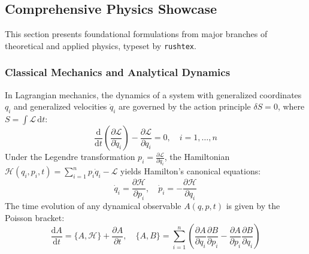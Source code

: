 \documentclass[11pt, a4paper]{article}
\begin{document}
\subsection{Comprehensive Physics Showcase}
This section presents foundational formulations from major branches of theoretical and applied physics, typeset by \texttt{rushtex}.

\subsubsection{Classical Mechanics and Analytical Dynamics}
In Lagrangian mechanics, the dynamics of a system with generalized coordinates $q_i$ and generalized velocities $\dot{q}_i$ are governed by the action principle $\delta S = 0$, where $S = \int \mathcal{L} \, \mathrm{d}t$:
\begin{equation}
\frac{\mathrm{d}}{\mathrm{d}t} \left( \frac{\partial \mathcal{L}}{\partial \dot{q}_i} \right) - \frac{\partial \mathcal{L}}{\partial q_i} = 0, \quad i = 1, \dots, n
\end{equation}
Under the Legendre transformation $p_i = \frac{\partial \mathcal{L}}{\partial \dot{q}_i}$, the Hamiltonian $\mathcal{H}(q_i, p_i, t) = \sum_{i=1}^n p_i \dot{q}_i - \mathcal{L}$ yields Hamilton's canonical equations:
\begin{equation}
\dot{q}_i = \frac{\partial \mathcal{H}}{\partial p_i}, \quad \dot{p}_i = -\frac{\partial \mathcal{H}}{\partial q_i}
\end{equation}
The time evolution of any dynamical observable $A(q, p, t)$ is given by the Poisson bracket:
\begin{equation}
\frac{\mathrm{d}A}{\mathrm{d}t} = \{A, \mathcal{H}\} + \frac{\partial A}{\partial t}, \quad \{A, B\} = \sum_{i=1}^n \left( \frac{\partial A}{\partial q_i}\frac{\partial B}{\partial p_i} - \frac{\partial A}{\partial p_i}\frac{\partial B}{\partial q_i} \right)
\end{equation}
\end{document}
